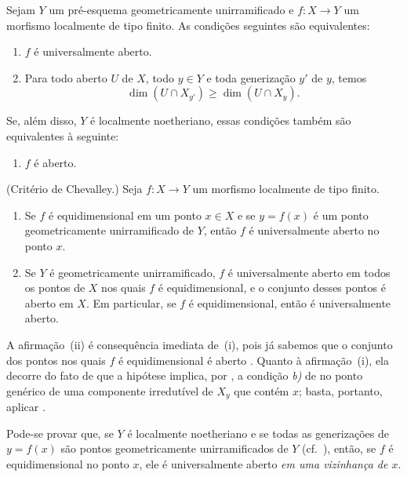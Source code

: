 \begin{corollary}[14.4.3]
\label{IV.14.4.3}
Sejam $Y$ um pré-esquema geometricamente unirramificado e $f:X\to Y$ um morfismo localmente de tipo finito.
As condições seguintes são equivalentes:
\begin{enumerate}[label=\emph{\alph*)}]
  \item $f$ é universalmente aberto.
  \item Para todo aberto $U$ de $X$, todo $y\in Y$ e toda generização $y'$ de $y$, temos
    \[
      \dim(U\cap X_{y'})\geq\dim(U\cap X_y).
    \]
\end{enumerate}
Se, além disso, $Y$ é localmente noetheriano, essas condições também são equivalentes à seguinte:
\begin{enumerate}[label=\emph{\alph*)}]
  \item[\emph{c)}] $f$ é aberto.
\end{enumerate}
\end{corollary}

\begin{corollary}[14.4.4]
\label{IV.14.4.4}
(Critério de Chevalley.) Seja $f:X\to Y$ um morfismo localmente de tipo finito.
\begin{enumerate}[label=(\roman*)]
  \item Se $f$ é equidimensional em um ponto $x\in X$  e se $y=f(x)$ é um ponto geometricamente unirramificado de $Y$, então $f$ é universalmente aberto no ponto $x$.
  \item Se $Y$ é geometricamente unirramificado, $f$ é universalmente aberto em todos os pontos de $X$ nos quais $f$ é equidimensional, e o conjunto desses pontos é aberto em $X$.
  Em particular, se $f$ é equidimensional, então é universalmente aberto.
\end{enumerate}
\end{corollary}

A afirmação~(ii) é consequência imediata de~(i), pois já sabemos que o conjunto dos pontos nos quais $f$ é equidimensional é aberto .
Quanto à afirmação~(i), ela decorre do fato de que a hipótese implica, por , a condição \emph{b)} de  no ponto genérico de uma componente irredutível de $X_y$ que contém $x$; basta, portanto, aplicar .

\begin{remark}[14.4.5]
\label{IV.14.4.5}
Pode-se provar que, se $Y$ é localmente noetheriano e se todas as generizações de $y=f(x)$ são pontos geometricamente unirramificados de $Y$ (cf.\ ), então, se $f$ é equidimensional no ponto $x$, ele é universalmente aberto \emph{em uma vizinhança de $x$}.
\end{remark}

